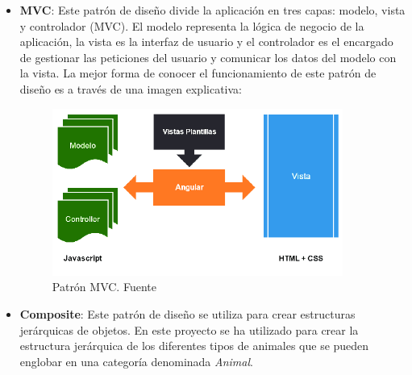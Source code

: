 \begin{itemize}
    \newpage

    \item \textbf{MVC}: Este patrón de diseño divide la aplicación en tres capas: modelo, vista y
    controlador (MVC). El modelo representa la lógica de negocio de la aplicación, la vista es la interfaz de usuario
    y el controlador es el encargado de gestionar las peticiones del usuario y comunicar los datos del modelo con la vista.
    La mejor forma de conocer el funcionamiento de este patrón de diseño es a través de una imagen explicativa:
        \begin{figure}[H]
            \centering
            \includegraphics[width=0.9\textwidth]{imgs/mvc.png}
            \caption{Patrón MVC. Fuente~\cite{mvc}}
            \label{fig:mvc}
        \end{figure}
    \item \textbf{Composite}: Este patrón de diseño se utiliza para crear estructuras jerárquicas de objetos. En este
    proyecto se ha utilizado para crear la estructura jerárquica de los diferentes tipos de animales que se pueden
    englobar en una categoría denominada \textit{Animal}.
\end{itemize}